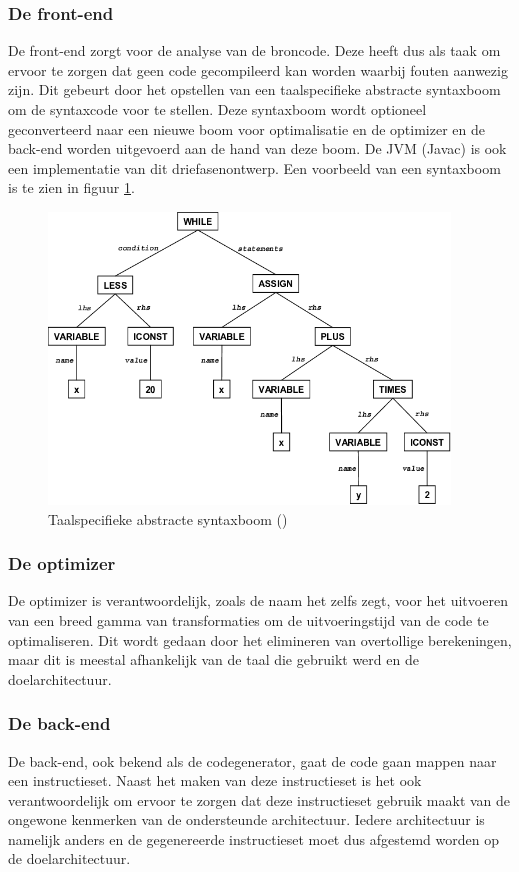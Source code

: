 \subsubsection{De front-end}
De front-end zorgt voor de analyse van de broncode. Deze heeft dus als taak om ervoor te zorgen dat geen code gecompileerd kan worden waarbij fouten aanwezig zijn. Dit gebeurt door het opstellen van een taalspecifieke abstracte syntaxboom om de syntaxcode voor te stellen. Deze syntaxboom wordt optioneel geconverteerd naar een nieuwe boom voor optimalisatie en de optimizer en de back-end worden uitgevoerd aan de hand van deze boom. De JVM (Javac) is ook een implementatie van dit driefasenontwerp. Een voorbeeld van een syntaxboom is te zien in figuur \ref{fig:syntaxtree}.

\begin{figure} [ht]
	\centering
	\includegraphics[width=0.95\textwidth]{img/syntaxtree.png}
	\caption{Taalspecifieke abstracte syntaxboom (\cite{ResearchGate})}
	\label{fig:syntaxtree}
\end{figure}

\subsubsection{De optimizer}
De optimizer is verantwoordelijk, zoals de naam het zelfs zegt, voor het uitvoeren van een breed gamma van transformaties om de uitvoeringstijd van de code te optimaliseren. Dit wordt gedaan door het elimineren van overtollige berekeningen, maar dit is meestal afhankelijk van de taal die gebruikt werd en de doelarchitectuur.

\subsubsection{De back-end}
De back-end, ook bekend als de codegenerator, gaat de code gaan mappen naar een instructieset. Naast het maken van deze instructieset is het ook verantwoordelijk om ervoor te zorgen dat deze instructieset gebruik maakt van de ongewone kenmerken van de ondersteunde architectuur. Iedere architectuur is namelijk anders en de gegenereerde instructieset moet dus afgestemd worden op de doelarchitectuur.


